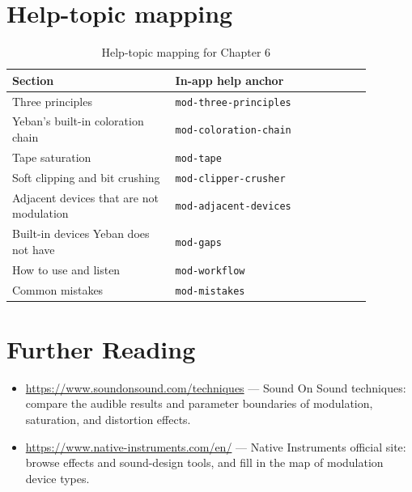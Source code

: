 \section{Help-topic mapping}

\begin{table}[htbp]
\centering
\small
\begin{tabular}{@{}p{0.40\linewidth}p{0.48\linewidth}@{}}
\hline
Section & In-app help anchor \\
\hline
Three principles & \texttt{mod-three-principles} \\
Yeban's built-in coloration chain & \texttt{mod-coloration-chain} \\
Tape saturation & \texttt{mod-tape} \\
Soft clipping and bit crushing & \texttt{mod-clipper-crusher} \\
Adjacent devices that are not modulation & \texttt{mod-adjacent-devices} \\
Built-in devices Yeban does not have & \texttt{mod-gaps} \\
How to use and listen & \texttt{mod-workflow} \\
Common mistakes & \texttt{mod-mistakes} \\
\hline
\end{tabular}
\caption{Help-topic mapping for Chapter 6}
\end{table}

\section*{Further Reading}
\begin{itemize}[leftmargin=1.5em]
\item \url{https://www.soundonsound.com/techniques} — Sound On Sound techniques: compare the audible results and parameter boundaries of modulation, saturation, and distortion effects.
\item \url{https://www.native-instruments.com/en/} — Native Instruments official site: browse effects and sound-design tools, and fill in the map of modulation device types.
\end{itemize}
